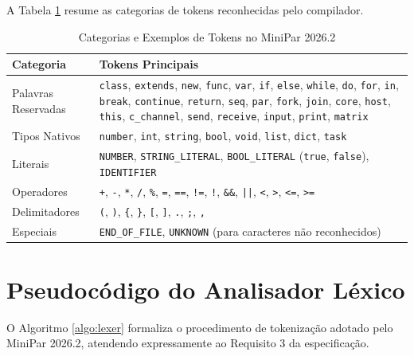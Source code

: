 A Tabela \ref{tab:tokens_lexicos} resume as categorias de tokens reconhecidas pelo compilador.

\begin{table}[htbp]
\centering
\caption{Categorias e Exemplos de Tokens no MiniPar 2026.2}
\label{tab:tokens_lexicos}
\small
\begin{tabular}{p{3.5cm}p{11cm}}
\toprule
Categoria & Tokens Principais \\
\midrule
Palavras Reservadas & \texttt{class}, \texttt{extends}, \texttt{new}, \texttt{func}, \texttt{var}, \texttt{if}, \texttt{else}, \texttt{while}, \texttt{do}, \texttt{for}, \texttt{in}, \texttt{break}, \texttt{continue}, \texttt{return}, \texttt{seq}, \texttt{par}, \texttt{fork}, \texttt{join}, \texttt{core}, \texttt{host}, \texttt{this}, \texttt{c\_channel}, \texttt{send}, \texttt{receive}, \texttt{input}, \texttt{print}, \texttt{matrix} \\
Tipos Nativos & \texttt{number}, \texttt{int}, \texttt{string}, \texttt{bool}, \texttt{void}, \texttt{list}, \texttt{dict}, \texttt{task} \\
Literais & \texttt{NUMBER}, \texttt{STRING\_LITERAL}, \texttt{BOOL\_LITERAL} (\texttt{true}, \texttt{false}), \texttt{IDENTIFIER} \\
Operadores & \texttt{+}, \texttt{-}, \texttt{*}, \texttt{/}, \texttt{\%}, \texttt{=}, \texttt{==}, \texttt{!=}, \texttt{!}, \texttt{\&\&}, \texttt{||}, \texttt{<}, \texttt{>}, \texttt{<=}, \texttt{>=} \\
Delimitadores & \texttt{(}, \texttt{)}, \texttt{\{}, \texttt{\}}, \texttt{[}, \texttt{]}, \texttt{.}, \texttt{;}, \texttt{,} \\
Especiais & \texttt{END\_OF\_FILE}, \texttt{UNKNOWN} (para caracteres não reconhecidos) \\
\bottomrule
\end{tabular}
\end{table}

\section{Pseudocódigo do Analisador Léxico}

O Algoritmo \ref{algo:lexer} formaliza o procedimento de tokenização adotado pelo MiniPar 2026.2, atendendo expressamente ao Requisito 3 da especificação.

